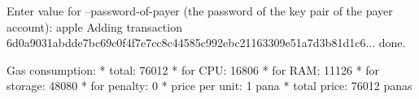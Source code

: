 \begin{shellbox}\begin{ttlst}
Enter value for --password-of-payer (the password of the key pair of the payer account): apple
Adding transaction 6d0a9031abdde7bc69c0f4f7e7cc8c44585c992ebc21163309e51a7d3b81d1c6... done.

Gas consumption:
 * total: 76012
   * for CPU: 16806
   * for RAM: 11126
   * for storage: 48080
   * for penalty: 0
 * price per unit: 1 pana
 * total price: 76012 panas
\end{ttlst}\end{shellbox}
